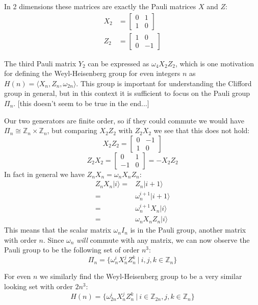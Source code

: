 \documentclass[]{article}
\newcommand{\ket}[1]{| #1 \rangle}
\begin{document}
In 2 dimensions these matrices are exactly the Pauli matrices $X$ and $Z$:
\begin{align*}
X_2 &= \left[\begin{matrix}0&1\\1&0\end{matrix}\right]
\\Z_2 &= \left[\begin{matrix}1&0\\0&-1\end{matrix}\right]
\end{align*}

The third Pauli matrix $Y_2$ can be expressed as $\omega_4X_2Z_2$, which is one motivation for defining the Weyl-Heisenberg group for even integers $n$ as $H(n) = \langle X_n, Z_n, \omega_{2n}\rangle$. This group is important for understanding the Clifford group in general, but in this context it is sufficient to focus on the Pauli group $\Pi_n$. [this doesn't seem to be true in the end...]

Our two generators are finite order, so if they could commute we would have $\Pi_n \cong \mathbb{Z}_n\times \mathbb{Z}_n$, but comparing $X_2Z_2$ with $Z_2X_2$ we see that this does not hold:
\[X_2Z_2 = \left[\begin{matrix}0&-1\\1&0\end{matrix}\right]\]
\[Z_2X_2 = \left[\begin{matrix}0&1\\-1&0\end{matrix}\right] = -X_2Z_2\]
In fact in general we have $Z_nX_n = \omega_nX_nZ_n$:
\begin{align*}
Z_nX_n\ket{i}
=& Z_n\ket{i+1}
\\=& \omega_n^{i+1}\ket{i+1}
\\=& \omega_n^{i+1}X_n\ket{i}
\\=& \omega_nX_nZ_n\ket{i}
\end{align*}
This means that the scalar matrix $\omega_nI_n$ is in the Pauli group, another matrix with order $n$. Since $\omega_n$ \textit{will} commute with any matrix, we can now observe the Pauli group to be the following set of order $n^3$:
\[\Pi_n = \{\omega_n^iX_n^jZ_n^k\ |\ i, j, k \in \mathbb{Z}_n\}\]

For even $n$ we similarly find the Weyl-Heisenberg group to be a very similar looking set with order $2n^3$:
\[H(n) = \{\omega_{2n}^iX_n^jZ_n^k\ |\ i \in \mathbb{Z}_{2n}, j, k \in \mathbb{Z}_n\}\]
\end{document}
